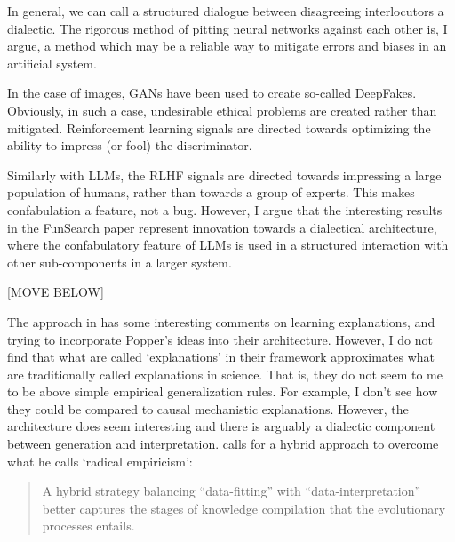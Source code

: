 \documentclass[11pt, oneside]{article}   	%
\begin{document}
In general, we can call a structured dialogue between disagreeing interlocutors a dialectic.  The rigorous method of pitting neural networks against each other is, I argue, a method which may be a reliable way to mitigate errors and biases in an artificial system.  



In the case of images, GANs have been used to create so-called DeepFakes.  Obviously, in such a case, undesirable ethical problems are created rather than mitigated.  Reinforcement learning signals are directed towards optimizing the ability to impress (or fool) the discriminator.

Similarly with LLMs, the RLHF signals are directed towards impressing a large population of humans, rather than towards a group of experts.  This makes confabulation a feature, not a bug.  However, I argue that the interesting results in the FunSearch paper represent innovation towards a dialectical architecture, where the confabulatory feature of LLMs is used in a structured interaction with other sub-components in a larger system.










[MOVE BELOW]


The approach in \citep{Norelli2022} has some interesting comments on learning explanations, and trying to incorporate Popper's ideas into their architecture. However, I do not find that what are called `explanations' in their framework approximates what are traditionally called explanations in science.  That is, they do not seem to me to be above simple empirical generalization rules.  For example, I don't see how they could be compared to causal mechanistic explanations.  However, the architecture does seem interesting and there is arguably a dialectic component between generation and interpretation. \citep{Pearl2021} calls for a hybrid approach to overcome what he calls `radical empiricism':

\begin{quote}
    A hybrid strategy balancing ``data-fitting'' with ``data-interpretation'' better captures the stages of knowledge compilation that the evolutionary processes entails. \citep[p. 80]{Pearl2021}
\end{quote}
\end{document}
